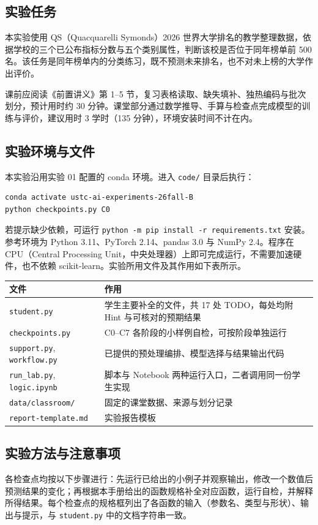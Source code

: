 \documentclass[UTF8,a4paper,11pt,fontset=fandol]{ctexart}
\newcommand{\file}[1]{\nolinkurl{#1}}
\begin{document}
\subsection{实验任务}
本实验使用 QS（Quacquarelli Symonds）2026 世界大学排名的教学整理数据，依据学校的三个已公布指标分数与五个类别属性，判断该校是否位于同年榜单前 500 名。该任务是同年榜单内的分类练习，既不预测未来排名，也不对未上榜的大学作出评价。

课前应阅读《前置讲义》第 1--5 节，复习表格读取、缺失填补、独热编码与批次划分，预计用时约 30 分钟。课堂部分通过数学推导、手算与检查点完成模型的训练与评价，建议用时 3 学时（135 分钟），环境安装时间不计在内。
\subsection{实验环境与文件}
本实验沿用实验 01 配置的 conda 环境。进入 \file{code/} 目录后执行：
\begin{lstlisting}[language=bash]
conda activate ustc-ai-experiments-26fall-B
python checkpoints.py C0
\end{lstlisting}
若提示缺少依赖，可运行 \texttt{python -m pip install -r requirements.txt} 安装。参考环境为 Python 3.11、PyTorch 2.14、pandas 3.0 与 NumPy 2.4。程序在 CPU（Central Processing Unit，中央处理器）上即可完成运行，不需要加速硬件，也不依赖 scikit-learn。实验所用文件及其作用如下表所示。
\par\noindent\begin{tabularx}{\linewidth}{L{4.4cm}Y}\toprule
文件 & 作用\\\midrule
\file{student.py} & 学生主要补全的文件，共 17 处 TODO，每处均附 Hint 与可核对的预期结果\\
\file{checkpoints.py} & C0--C7 各阶段的小样例自检，可按阶段单独运行\\
\file{support.py}, \file{workflow.py} & 已提供的预处理编排、模型选择与结果输出代码\\
\file{run_lab.py}, \file{logic.ipynb} & 脚本与 Notebook 两种运行入口，二者调用同一份学生实现\\
\file{data/classroom/} & 固定的课堂数据、来源与划分记录\\
\file{report-template.md} & 实验报告模板\\\bottomrule
\end{tabularx}
\subsection{实验方法与注意事项}
各检查点均按以下步骤进行：先运行已给出的小例子并观察输出，修改一个数值后预测结果的变化；再根据本手册给出的函数规格补全对应函数，运行自检，并解释所得结果。每个检查点的规格框列出了各函数的输入（参数名、类型与形状）、输出与提示，与 \file{student.py} 中的文档字符串一致。
\end{document}
